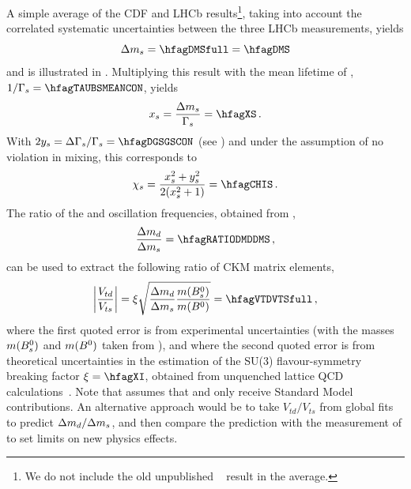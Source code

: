 A simple average of the CDF and LHCb results\footnote{
  \label{foot:life_mix:D0note5618:2008}
  We do not include the old unpublished
  \dzero~\cite{D0note5618:2008,*D0note5474:2007,*D0note5254:2006,*Abazov:2006dm_mod_cont}
  result in the average.},
taking into account the correlated systematic uncertainties between the three 
LHCb measurements, yields 
\begin{equation}
\dms = \hfagDMSfull = \hfagDMS \labe{dms}
\end{equation}
and is illustrated in .
Multiplying this result with the 
mean \Bs lifetime of , $1/\Gs=\hfagTAUBSMEANCON$,
yields
\begin{equation}
\xs = \frac{\dms}{\Gs} = \hfagXS \,. \labe{xs}
\end{equation}
With $2\ys = \DGGs=\hfagDGSGSCON$ 
(see )
and under the assumption of no \CP violation in \Bs mixing,
this corresponds to
\begin{equation}
\chis = \frac{\xs^2+\ys^2}{2(\xs^2+1)} = \hfagCHIS \,. \labe{chis}
\end{equation}
The ratio of the \Bd and \Bs oscillation frequencies, 
obtained from , 
\begin{equation}
\frac{\dmd}{\dms} = \hfagRATIODMDDMS \,, \labe{dmd_over_dms}
\end{equation}
can be used to extract the following ratio of CKM matrix elements, 
\begin{equation}
\left|\frac{V_{td}}{V_{ts}}\right| =
\xi \sqrt{\frac{\dmd}{\dms}\frac{m(\Bs)}{m(\Bd)}} = 
\hfagVTDVTSfull \,, \labe{Vtd_over_Vts}
\end{equation}
where the first quoted error is from experimental uncertainties 
(with the masses $m(B^0_s)$ and $m(B^0)$ taken from ),
and where the second quoted error is from theoretical uncertainties 
in the estimation of the SU(3) flavour-symmetry breaking factor
$\xi %
= \hfagXI$,
obtained from unquenched lattice QCD calculations~\cite{Aoki:2013ldr_mod}.
Note that  assumes that \dms and \dmd only receive 
Standard Model contributions. An alternative approach would be to 
take $V_{td}/V_{ts}$ from global fits to predict $\Delta m_{d}/\Delta m_{s}$, and then 
compare the prediction with the measurement
of  to set limits on 
new physics effects. 

 

